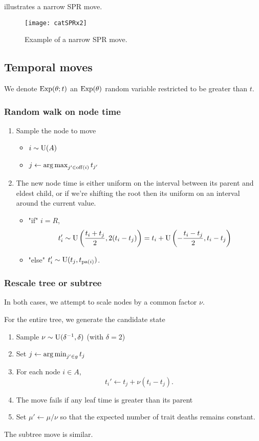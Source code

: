 \documentclass[11pt,a4paper]{article}
\begin{document}
 illustrates a narrow SPR move.
\begin{figure}[htb]
	\centering
	\texttt{[image: catSPRx2]}
    \caption{Example of a narrow SPR move.}
    \label{fig:spr-narrow}
\end{figure}


\subsection{Temporal moves}

We denote $ \mathrm{Exp}(\theta; t) $ an $ \mathrm{Exp}(\theta) $ random variable restricted to be greater than $ t $.

\subsubsection{Random walk on node time}


\begin{enumerate}
    \item Sample the node to move
    \begin{itemize}
        \item $ i \sim \mathrm{U}(A) $
        \item $ j \leftarrow \operatorname*{arg\,max}_{j' \in \operatorname*{\mathrm{off}}(i)} t_{j'} $
    \end{itemize}
    \item The new node time is either uniform on the interval between its parent and eldest child, or if we're shifting the root then its uniform on an interval around the current value.
    \begin{itemize}
        \item "if" $ i = R $,
        \[
            t_i' \sim \mathrm{U}\left(\frac{t_i + t_j}{2}, 2(t_i - t_j)\right)
                = t_i + \mathrm{U}\left(-\frac{t_i - t_j}{2}, t_i - t_j\right)
        \]
        \item "else" $ t_i' \sim \mathrm{U}(t_j, t_{\operatorname*{\mathrm{pa}}(i)}) $.
    \end{itemize}
\end{enumerate}

\subsubsection{Rescale tree or subtree}

In both cases, we attempt to scale nodes by a common factor $ \nu $.

For the entire tree, we generate the candidate state
\begin{enumerate}
    \item Sample $ \nu \sim \mathrm{U}(\delta^{-1}, \delta) $ (with $ \delta = 2 $)
    \item Set $ j \leftarrow \operatorname*{arg\,min}_{j' \in g} t_j $
    \item For each node $ i \in A $,
    \[
        t_i' \leftarrow t_j + \nu (t_i - t_j).
    \]
    \item The move fails if any leaf time is greater than its parent
    \item Set $ \mu' \leftarrow \mu / \nu $ so that the expected number of trait deaths remains constant.
\end{enumerate}
The subtree move is similar.
\end{document}
